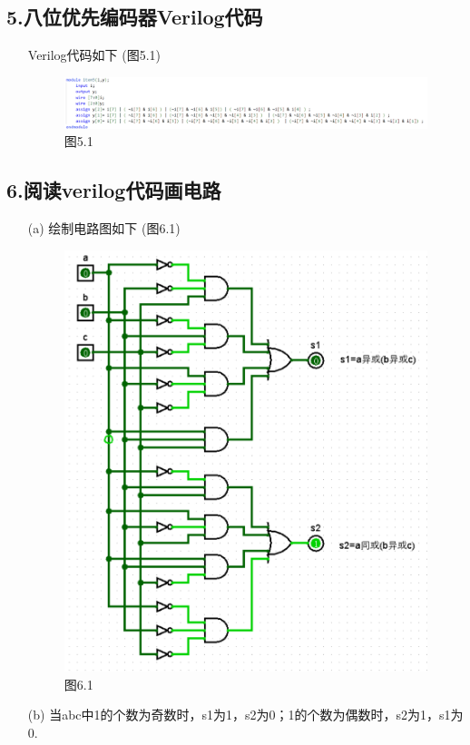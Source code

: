 \documentclass{article}
\begin{document}
        \subsection*{5.八位优先编码器Verilog代码}
            \begin{enumerate}
                \item []Verilog代码如下 (图5.1)
                \begin{figure}[htbp]
                    \centering
                    \includegraphics[scale=0.5]{t5v.png}
                    \caption*{图5.1}
                \end{figure}
            \end{enumerate}

        \subsection*{6.阅读verilog代码画电路}
            \begin{enumerate}
                \item [(a)]绘制电路图如下 (图6.1)
                \begin{figure}[htbp]
                    \centering
                    \includegraphics[scale=0.5]{t61.png}
                    \caption*{图6.1}
                \end{figure}
                \item [(b)]当abc中1的个数为奇数时，s1为1，s2为0；1的个数为偶数时，s2为1，s1为0.
            \end{enumerate}
    \clearpage
\end{document}
